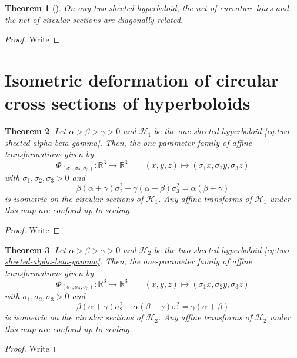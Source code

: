 \documentclass[12pt,a4paper]{article}
\theoremstyle{BoldTopSpacing}
\newtheorem{theorem}{Theorem}[section]
\theoremstyle{BoldTopSpacing}
\theoremstyle{BoldTopSpacing}
\theoremstyle{BoldTopBottomSpacing}
\theoremstyle{BoldTopSpacing}
\theoremstyle{BoldTopBottomSpacing}
\theoremstyle{remark}
\begin{document}
\begin{theorem}[]
\label{thm:diagonally-related-two-sheeted}
On any two-sheeted hyperboloid, the net of curvature lines and the net of circular sections are diagonally related.
\end{theorem}
\begin{proof}
    Write
\end{proof}
\pagebreak
\section{Isometric deformation of circular cross sections of hyperboloids}
\begin{theorem}
\label{thm:affine-transformation-one-sheeted}
Let $\alpha > \beta > \gamma > 0$ and $\mathcal{H}_{1}$ be the one-sheeted hyperboloid \eqref{eq:two-sheeted-alpha-beta-gamma}. Then, the one-parameter family of affine transformations given by
\[
    \Phi_{(\sigma_1, \sigma_2, \sigma_3)} : \mathbb{R}^3 \to \mathbb{R}^3 \quad \quad (x, y, z) \mapsto (\sigma_{1}x, \sigma_{2}y, \sigma_{3}z)
\]
with $\sigma_{1}, \sigma_{2}, \sigma_{3} > 0$ and
\begin{equation}
    \beta(\alpha + \gamma) \sigma_{2}^2 + \gamma(\alpha - \beta) \sigma_{3}^2 = \alpha (\beta + \gamma)
\end{equation}
is isometric on the circular sections of $\mathcal{H}_1$. Any affine transforms of $\mathcal{H}_1$ under this map are confocal up to scaling.
\end{theorem}
\begin{proof}
    Write
\end{proof}

\begin{theorem}
\label{thm:affine-transformation-two-hyperboloid}
Let $\alpha > \beta > \gamma > 0$ and $\mathcal{H}_{2}$ be the two-sheeted hyperboloid \eqref{eq:two-sheeted-alpha-beta-gamma}. Then, the one-parameter family of affine transformations given by
\[
    \Phi_{(\sigma_1, \sigma_2, \sigma_3)} : \mathbb{R}^3 \to \mathbb{R}^3 \quad \quad (x, y, z) \mapsto (\sigma_{1}x, \sigma_{2}y, \sigma_{3}z)
\]
with $\sigma_{1}, \sigma_{2}, \sigma_{3} > 0$ and
\begin{equation}
    \beta (\alpha + \gamma) \sigma_{2}^2 - \alpha (\beta - \gamma) \sigma_{1}^2 = \gamma (\alpha + \beta)
\end{equation}
is isometric on the circular sections of $\mathcal{H}_2$. Any affine transforms of $\mathcal{H}_2$ under this map are confocal up to scaling.
\end{theorem}
\begin{proof}
    Write
\end{proof}
\end{document}
